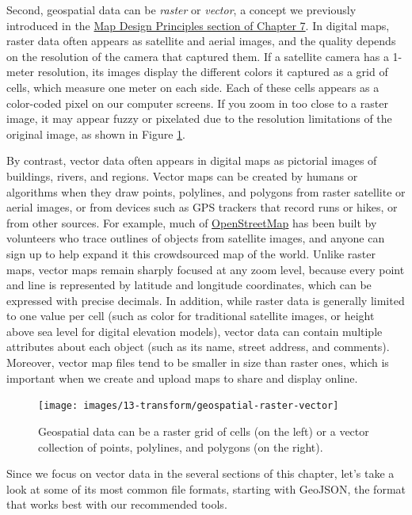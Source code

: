 \documentclass[
  english,
]{book}
\begin{document}
Second, geospatial data can be \emph{raster} or \emph{vector}, a concept we previously introduced in the \href{map-design.html}{Map Design Principles section of Chapter 7}. In digital maps, raster data often appears as satellite and aerial images, and the quality depends on the resolution of the camera that captured them. If a satellite camera has a 1-meter resolution, its images display the different colors it captured as a grid of cells, which measure one meter on each side. Each of these cells appears as a color-coded pixel on our computer screens. If you zoom in too close to a raster image, it may appear fuzzy or pixelated due to the resolution limitations of the original image, as shown in Figure \ref{fig:geospatial-raster-vector}.

By contrast, vector data often appears in digital maps as pictorial images of buildings, rivers, and regions. Vector maps can be created by humans or algorithms when they draw points, polylines, and polygons from raster satellite or aerial images, or from devices such as GPS trackers that record runs or hikes, or from other sources. For example, much of \href{https://www.openstreetmap.org}{OpenStreetMap} has been built by volunteers who trace outlines of objects from satellite images, and anyone can sign up to help expand it this crowdsourced map of the world. Unlike raster maps, vector maps remain sharply focused at any zoom level, because every point and line is represented by latitude and longitude coordinates, which can be expressed with precise decimals. In addition, while raster data is generally limited to one value per cell (such as color for traditional satellite images, or height above sea level for digital elevation models), vector data can contain multiple attributes about each object (such as its name, street address, and comments). Moreover, vector map files tend to be smaller in size than raster ones, which is important when we create and upload maps to share and display online.



\begin{figure}
\texttt{[image: images/13-transform/geospatial-raster-vector]} \caption{Geospatial data can be a raster grid of cells (on the left) or a vector collection of points, polylines, and polygons (on the right).}\label{fig:geospatial-raster-vector}
\end{figure}

Since we focus on vector data in the several sections of this chapter, let's take a look at some of its most common file formats, starting with GeoJSON, the format that works best with our recommended tools.
\end{document}
